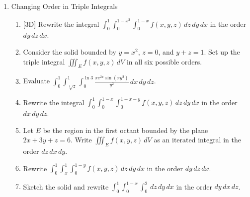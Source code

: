 \documentclass[12pt]{article}
\newcommand{\dimtag}[1]{{\footnotesize\textsc{[#1]}}\;}
\begin{document}
\begin{enumerate}
\item Changing Order in Triple Integrals
    \begin{enumerate}
        \item \dimtag{3D} Rewrite the integral $\int_0^1 \int_0^{1-x^2} \int_0^{1-x} f(x,y,z) \, dz \, dy \, dx$ in the order $dy \, dz \, dx$.
        \item Consider the solid bounded by $y=x^2$, $z=0$, and $y+z=1$. Set up the triple integral $\iiint_E f(x,y,z) \, dV$ in all six possible orders.
        \item Evaluate $\int_0^1 \int_{\sqrt[3]{z}}^1 \int_0^{\ln 3} \frac{\pi e^{2x} \sin(\pi y^2)}{y^2} \, dx \, dy \, dz$.
        \item Rewrite the integral $\int_0^1 \int_0^{1-x} \int_0^{1-x-y} f(x,y,z) \, dz \, dy \, dx$ in the order $dx \, dy \, dz$.
        \item Let $E$ be the region in the first octant bounded by the plane $2x + 3y + z = 6$. Write $\iiint_E f(x,y,z) \, dV$ as an iterated integral in the order $dz \, dx \, dy$.
        \item Rewrite $\int_0^1 \int_x^1 \int_0^{1-y} f(x,y,z) \, dz \, dy \, dx$ in the order $dy \, dz \, dx$.
        \item Sketch the solid and rewrite $\displaystyle\int_0^1\!\int_0^{1-x}\!\int_0^{2}\,dz\,dy\,dx$ in the order $dy\,dx\,dz$.
    \end{enumerate}
\newpage


\end{enumerate}
\end{document}
